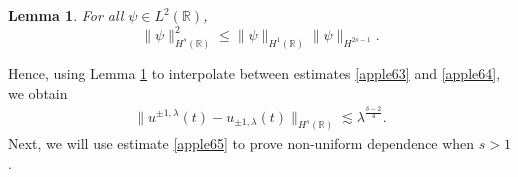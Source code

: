 \documentclass[12pt,reqno]{amsart}
\newcommand{\rr}{\mathbb{R}}
\theoremstyle{plain}  %
\newtheorem{lemma}{Lemma}
\theoremstyle{definition}
\begin{document}
		\begin{lemma}
			\label{apple403}
			For all $\psi \in L^2(\rr)$,
			\begin{equation*}
				\|\psi \|_{H^s (\rr)}^2 \leq  \| \psi \|_{H^1 (\rr)} \| \psi
				\|_{H^{2s-1}}. 
			\end{equation*}
		\end{lemma}
			Hence, using Lemma \ref{apple403} to interpolate between estimates
			\eqref{apple63} and \eqref{apple64}, we obtain
			\begin{equation}
				\begin{split}
					\|u^{\pm 1, \lambda}(t) - u_{\pm 1, \lambda}(t)
					\|_{H^s(\rr)}
					\lesssim \lambda^{\frac{\delta -2}{4}}.
					\label{apple65}
				\end{split}
			\end{equation}
			Next, we will use estimate \eqref{apple65} to prove non-uniform
			dependence when $s > 1$.




  
\end{document}
